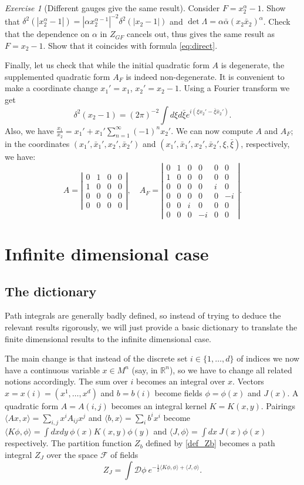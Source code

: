 \documentclass[10pt]{amsart}
\theoremstyle{definition}
\theoremstyle{remark}
\newtheorem{exs}[thm]{Exercise}
\newcommand{\R}{\mathbb R}
\def\<{\langle}
\def\>{\rangle}
\newcommand{\bx}{\bar{x}}
\newcommand{\cD}{\mathcal{D}}
\newcommand{\cF}{\mathcal{F}}
\newcommand{\Ga}{\alpha}
\newcommand{\Gd}{\delta}
\newcommand{\GL}{\Lambda}
\begin{document}
\begin{exs}[Different gauges give the same result]
Consider $F=x_2^\Ga-1$. Show that $\Gd^2(|x_2^\Ga-1|)=|\Ga
x_2^{\Ga-1}|^{-2}\Gd^2(|x_2-1|)$ and
$\det \GL =\Ga\bar{\Ga}(x_2\bx_2)^\Ga$. Check that the dependence
on $\Ga$ in $Z_{GF}$ cancels out, thus gives the same result as
$F=x_2-1$. Show that it coincides with formula \eqref{eq:direct}.
\end{exs}

Finally, let us check that while the initial quadratic form $A$ is
degenerate, the supplemented quadratic form $A_F$ is indeed
non-degenerate. It is convenient to make a coordinate change
$x_1'=x_1$, $x_2'=x_2-1$. Using a Fourier transform we get
$$
   \Gd^2(x_2-1)=(2\pi)^{-2}\int d\xi d\bar{\xi}
        e^{i(\xi x_2'-\bar{\xi}\bx_2')}.
$$
Also, we have
$\frac{x_1}{x_2}=x_1'+x_1'\sum_{n=1}^\infty (-1)^n x_2'$. We can
now compute $A$ and $A_F$; in the coordinates
$(x_1',\bx_1',x_2',\bx_2')$ and
$(x_1',\bx_1',x_2',\bx_2',\xi,\bar{\xi})$, respectively, we have:
$$
  A=\left|\begin{array}{cccc}0&1&0&0\\1&0&0&0\\0&0&0&0\\0&0&0&0
   \end{array}\right| ,
\quad A_F=\left|\begin{array}{cccccc}0&1&0&0&0&0\\
1&0&0&0&0&0\\0&0&0&0&i&0\\0&0&0&0&0&-i\\0&0&i&0&0&0\\0&0&0&-i&0&0
\end{array}\right| .
$$

\section{Infinite dimensional case}

\subsection{The dictionary}
Path integrals are generally badly defined, so instead of trying
to deduce the relevant results rigorously, we will just provide a
basic dictionary to translate the finite dimensional results to
the infinite dimensional case.

The main change is that instead of the discrete set
$i\in\{1,\dots,d\}$ of indices we now have a continuous variable
$x\in M^n$ (say, in $\R^n$), so we have to change all related
notions accordingly. The sum over $i$ becomes an integral over
$x$. Vectors $x=x(i)=(x^1,\dots,x^d)$ and $b=b(i)$ become fields
$\phi=\phi(x)$ and $J(x)$. A quadratic form $A=A(i,j)$ becomes an
integral kernel $K=K(x,y)$.
Pairings $\<Ax,x\>=\sum_{i,j}x^i A_{ij} x^j$ and $\<b,x\>=\sum_i
b^ix^i$ become $\<K\phi,\phi\>=\int dxdy\ \phi(x)K(x,y)\phi(y)$
and $\<J,\phi\>=\int dx\ J(x)\phi(x)$ respectively.
The partition function $Z_b$ defined by \eqref{def_Zb} becomes a
path integral $Z_J$ over the space $\cF$ of fields
$$
   Z_J=\int \cD\phi\ e^{-\frac12\<K\phi,\phi\>+\<J,\phi\>}.
$$
\end{document}
